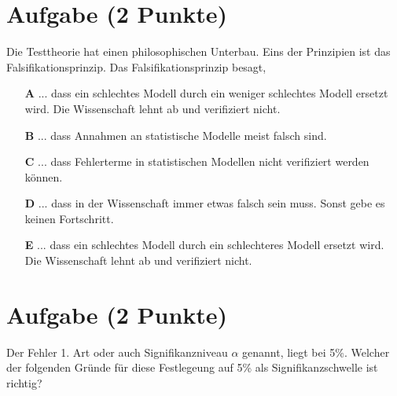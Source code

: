 \documentclass[a4paper, 9pt]{scrartcl}\usepackage[]{graphicx}\usepackage[]{xcolor}
\begin{document}
\section{Aufgabe \hfill (2 Punkte)}



Die Testtheorie hat einen philosophischen Unterbau. Eins der Prinzipien ist das Falsifikationsprinzip. Das Falsifikationsprinzip besagt,



\begin{enumerate}
\item [\textbf{A} \msquare] ... dass ein schlechtes Modell durch ein weniger schlechtes Modell ersetzt wird. Die Wissenschaft lehnt ab und verifiziert nicht.
\item [\textbf{B} \msquare] ... dass Annahmen an statistische Modelle meist falsch sind.
\item [\textbf{C} \msquare] ... dass Fehlerterme in statistischen Modellen nicht verifiziert werden können.
\item [\textbf{D} \msquare] ... dass in der Wissenschaft immer etwas falsch sein muss. Sonst gebe es keinen Fortschritt.
\item [\textbf{E} \msquare] ... dass ein schlechtes Modell durch ein schlechteres Modell ersetzt wird. Die Wissenschaft lehnt ab und verifiziert nicht.
\end{enumerate}

\section{Aufgabe \hfill (2 Punkte)}



Der Fehler 1. Art oder auch Signifikanzniveau $\alpha$ genannt, liegt bei
5\%. Welcher der folgenden Gründe für diese Festlegeung auf 5\% als Signifikanzschwelle ist richtig?
\end{document}
